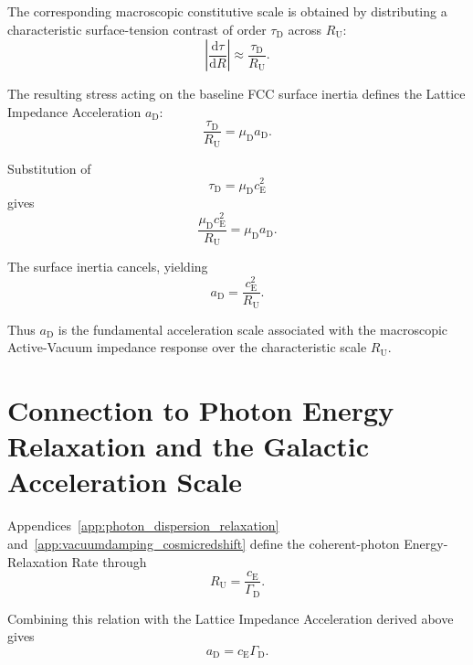 The corresponding macroscopic constitutive scale is obtained by distributing
a characteristic surface-tension contrast of order $\tau_{\mathrm D}$ across
$R_{\mathrm U}$:
\begin{equation}
    \left|
        \frac{
            \mathrm d\tau
        }{
            \mathrm dR
        }
    \right|
    \approx
    \frac{
        \tau_{\mathrm D}
    }{
        R_{\mathrm U}
    }.
\end{equation}

The resulting stress acting on the baseline FCC surface inertia defines the
Lattice Impedance Acceleration $a_{\mathrm D}$:
\begin{equation}
    \frac{
        \tau_{\mathrm D}
    }{
        R_{\mathrm U}
    }
    =
    \mu_{\mathrm D}
    a_{\mathrm D}.
\end{equation}

Substitution of
\begin{equation}
    \tau_{\mathrm D}
    =
    \mu_{\mathrm D}c_{\mathrm E}^{2}
\end{equation}
gives
\begin{equation}
    \frac{
        \mu_{\mathrm D}c_{\mathrm E}^{2}
    }{
        R_{\mathrm U}
    }
    =
    \mu_{\mathrm D}
    a_{\mathrm D}.
\end{equation}

The surface inertia cancels, yielding
\begin{equation}
    \boxed{
    a_{\mathrm D}
    =
    \frac{
        c_{\mathrm E}^{2}
    }{
        R_{\mathrm U}
    }.
    }
\end{equation}

Thus $a_{\mathrm D}$ is the fundamental acceleration scale associated with the
macroscopic Active-Vacuum impedance response over the characteristic scale
$R_{\mathrm U}$.

\section{Connection to Photon Energy Relaxation and the Galactic Acceleration Scale}

Appendices~\ref{app:photon_dispersion_relaxation}
and~\ref{app:vacuumdamping_cosmicredshift} define the coherent-photon Energy-Relaxation Rate through
\begin{equation}
    R_{\mathrm U}
    =
    \frac{
        c_{\mathrm E}
    }{
        \Gamma_{\mathrm D}
    }.
\end{equation}

Combining this relation with the Lattice Impedance Acceleration derived above
gives
\begin{equation}
    \boxed{
    a_{\mathrm D}
    =
    c_{\mathrm E}
    \Gamma_{\mathrm D}.
    }
\end{equation}

